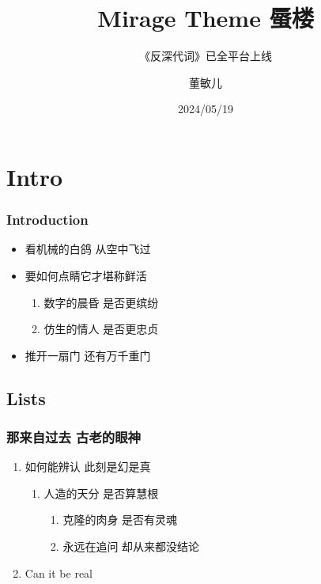 \documentclass[aspectratio=1610,linespread=1.4,t]{ctexbeamer}
\title{Mirage Theme 蜃楼}
\subtitle{《反深代词》已全平台上线}
\author{董敏儿}
\institute{（懂自懂）}
\date{2024/05/19}
\begin{document}
\frame{\maketitle}

\section{Intro}
\begin{frame}
\frametitle{Introduction}

\begin{itemize}
    \item 看机械的白鸽\faDove{} 从空中飞过 
    \item 要如何点睛\faEye[regular] 它才堪称鲜活

\begin{enumerate}
    \item 数字的晨昏\faCloudSun{} 是否更缤纷\faCloudMoon
    \item 仿生的情人\faGrinHearts{} 是否更忠贞\faGrin*[regular]
\end{enumerate}

    \item 推开一扇门\faDoorOpen{} 还有万千重门\faDoorClosed{\small\faDoorClosed}{\footnotesize\faDoorClosed}{\scriptsize\faDoorClosed}{\tiny\faDoorClosed}
\end{itemize}

\end{frame}

\subsection{Lists}
\begin{frame}
\frametitle{那来自过去 古老的眼神}
    \begin{enumerate}
        \item 如何能辨认 此刻是幻是真
        \begin{enumerate}
	        \item 人造的天分 是否算慧根
	        \begin{enumerate}
		        \item 克隆的肉身 是否有灵魂
		        \item 永远在追问 却从来都没结论
	        \end{enumerate}
        \end{enumerate}
        \item \alert{Can it be real}
    \end{enumerate}

\end{frame}
\end{document}
